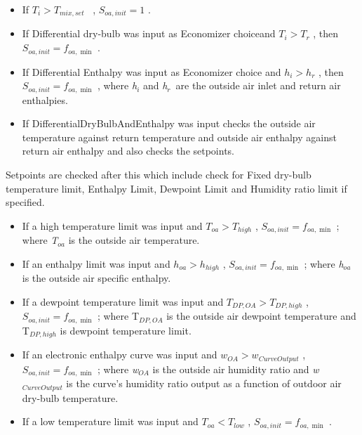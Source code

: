 \begin{itemize}
\item If \({T_i} > {T_{mix,set}}\) ~, \({S_{oa,init}} = 1\) .

\item If Differential dry-bulb was input as Economizer choiceand \({T_i} > {T_r}\) , then \({S_{oa,init}} = {f_{oa,\min }}\) .

\item If Differential Enthalpy was input as Economizer choice and \({h_i} > {h_r}\) , then \({S_{oa,init}} = {f_{oa,\min }}\) , where \emph{h\(_{i}\)} and \emph{h\(_{r}\)}~are the outside air inlet and return air enthalpies.

\item If DifferentialDryBulbAndEnthalpy was input checks the outside air temperature against return temperature and outside air enthalpy against return air enthalpy and also checks the setpoints.

\end{itemize}

Setpoints are checked after this which include check for Fixed dry-bulb temperature limit, Enthalpy Limit, Dewpoint Limit and Humidity ratio limit if specified.

\begin{itemize}

\item  If a high temperature limit was input and \({T_{oa}} > {T_{high}}\) , \({S_{oa,init}} = {f_{oa,\min }}\) ; where \emph{T\(_{oa}\)} is the outside air temperature.

\item  If an enthalpy limit was input and \({h_{oa}} > {h_{high}}\) , \({S_{oa,init}} = {f_{oa,\min }}\) ; where \emph{h\(_{oa}\)} is the outside air specific enthalpy.

\item  If a dewpoint temperature limit was input and \({T_{DP,OA}} > {T_{DP,high}}\) , \({S_{oa,init}} = {f_{oa,\min }}\) ; where T\(_{DP,OA}\) is the outside air dewpoint temperature and T\(_{DP,high}\) is dewpoint temperature limit.

\item  If an electronic enthalpy curve was input and \({w_{OA}} > {w_{CurveOutput}}\) , \({S_{oa,init}} = {f_{oa,\min }}\) ; where \emph{w}\(_{OA}\) is the outside air humidity ratio and \emph{w}\(_{CurveOutput}\) is the curve's humidity ratio output as a function of outdoor air dry-bulb temperature.

\item  If a low temperature limit was input and \({T_{oa}} < {T_{low}}\) , \({S_{oa,init}} = {f_{oa,\min }}\) .

\end{itemize}

